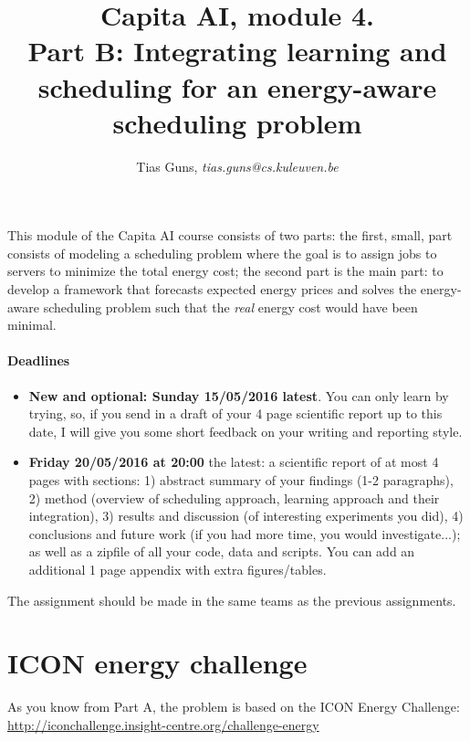 \documentclass[a4,12pt]{article}
\title{Capita AI, module 4.\\Part B: Integrating learning and scheduling for an energy-aware scheduling problem}
\author{Tias Guns, \textit{tias.guns@cs.kuleuven.be}}
\begin{document}
\maketitle

This module of the Capita AI course consists of two parts: the first, small, part consists of modeling a scheduling problem where the goal is to assign jobs to servers to minimize the total energy cost; the second part is the main part: to develop a framework that forecasts expected energy prices and solves the energy-aware scheduling problem such that the \textit{real} energy cost would have been minimal.

\paragraph{Deadlines}
\begin{itemize}
\item \textbf{New and optional: Sunday 15/05/2016 latest}. You can only learn by trying, so, if you send in a draft of your 4 page scientific report up to this date, I will give you some short feedback on your writing and reporting style.
\item \textbf{Friday 20/05/2016 at 20:00} the latest: a scientific report of at most 4 pages with sections: 1) abstract summary of your findings (1-2 paragraphs), 2) method (overview of scheduling approach, learning approach and their integration), 3) results and discussion (of interesting experiments you did), 4) conclusions and future work (if you had more time, you would investigate...); as well as a zipfile of all your code, data and scripts. You can add an additional 1 page appendix with extra figures/tables.
\end{itemize}

The assignment should be made in the same teams as the previous assignments.


\section{ICON energy challenge}
As you know from Part A, the problem is based on the ICON Energy Challenge:\\
\url{http://iconchallenge.insight-centre.org/challenge-energy}
\end{document}
